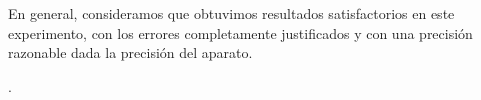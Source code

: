 \documentclass[%
 reprint,
 amsmath,amssymb,
 aps,
]{revtex4-1}
\begin{document}
En general, consideramos que obtuvimos resultados satisfactorios en este experimento, con los errores completamente justificados y con una precisión razonable dada la precisión del aparato.\\

\begin{thebibliography}{99} 
.\\ 
\\ \end{thebibliography}
\end{document}
